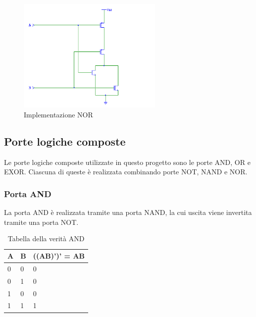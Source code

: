 \documentclass[10pt]{article}
\begin{document}
\begin{itemize}
    \begin{figure}[ht]
    \begin{minipage}[b]{0.4\textwidth}
    
    \includegraphics[width=70mm]{nor}
    \caption{Implementazione NOR}
    \label{ }
    \end{minipage}
    \end{figure}

\subsection{Porte logiche composte}
Le porte logiche composte utilizzate in questo progetto sono le porte AND, OR e EXOR. Ciascuna di queste è realizzata combinando porte NOT, NAND e NOR.

\subsubsection{Porta AND}
La porta AND è realizzata tramite una porta NAND, la cui uscita viene invertita tramite una porta NOT.
\begin{table}[H]
    \begin{minipage}[b]{0.4\textwidth}
    \centering
    \begin{tabular}{|ll|l|}
        \hline
        \textbf{A} & \textbf{B} & \textbf{((AB)')' = AB} \\ \hline
        0          & 0          & 0          \\ \hline
        0          & 1          & 0          \\ 
        1          & 0          & 0          \\ 
        1          & 1          & 1          \\ \hline
        \end{tabular}
        \caption{Tabella della verità AND}
        \label{table:student}
    \end{minipage}
    \end{table}
    

\end{itemize}
\end{document}
